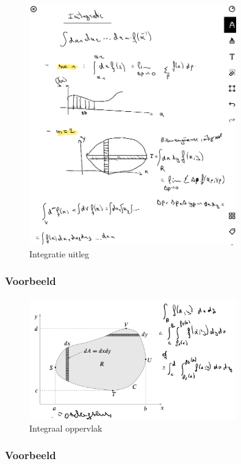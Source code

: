 \documentclass[a4paper]{article}
\begin{document}
\begin{figure}[H]
	\centering
	\includegraphics[width=0.8\textwidth]{assets/integralen_uitleg.png}
	\caption{Integratie uitleg}
	\label{fig:integralen_uitleg}
\end{figure}

\subsubsection{Voorbeeld}


\begin{figure}[H]
	\centering
	\includegraphics[width=0.8\textwidth]{assets/integraal_oppervalk.png}
	\caption{Integraal oppervlak}
	\label{fig:integraal_oppervalk}
\end{figure}


\subsubsection{Voorbeeld}
\end{document}
